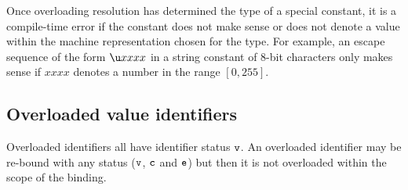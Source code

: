 {       Once overloading resolution has determined the type of a special constant,
       it is a compile-time error if the constant does not make sense or does not 
       denote a value within the machine representation chosen for the type.
       For example, an escape sequence of the form $\uconst$ in a string constant
       of 8-bit characters only makes sense if $xxxx$  denotes
       a number in the range $[0, 255]$. 


\subsection{Overloaded value identifiers}
Overloaded identifiers all have identifier status $\hbox{\tt v}$. An
overloaded identifier may be re-bound with any status ($\hbox{\tt v}$, $\hbox{\tt c}$
and $\hbox{\tt e}$) but then it is not overloaded within the scope of
the binding.

}
